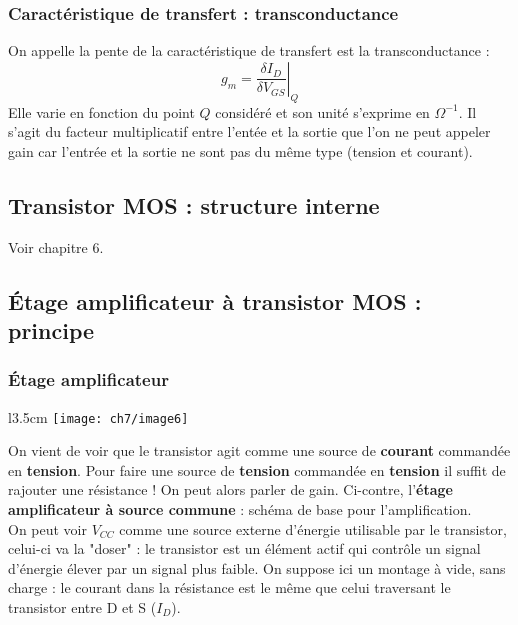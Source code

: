 	\subsubsection{Caractéristique de transfert : transconductance}	
	On appelle la pente de la caractéristique de transfert est la transconductance :
	\begin{equation}
	g_m = \left.\dfrac{\delta I_D}{\delta V_{GS}}\right|_Q
	\end{equation}
	Elle varie en fonction du point $Q$ considéré et son unité s'exprime en 
	$\Omega^{-1}$. Il s'agit du facteur multiplicatif entre l'entée et la sortie que 
	l'on ne peut appeler gain car l'entrée et la sortie ne sont pas du même type (tension 
	et courant).
	
	
	
	\subsection{Transistor MOS : structure interne}	
	Voir chapitre 6.
	
	\subsection{Étage amplificateur à transistor MOS : principe}
		\subsubsection{Étage amplificateur}
			\begin{wrapfigure}[11]{l}{3.5cm}
	\vspace{-0.5cm}
	\texttt{[image: ch7/image6]}
	\end{wrapfigure}
		On vient de voir que le transistor agit comme une source de \textbf{courant} 
		commandée en \textbf{tension}. Pour faire une source de \textbf{tension} 
		commandée en \textbf{tension} il suffit de rajouter une résistance ! On peut 
		alors parler de gain. Ci-contre, l'\textbf{étage amplificateur à source 
		commune} : schéma de base pour l'amplification. \\
		
		On peut voir $V_{CC}$ comme une source externe d'énergie utilisable par le 
		transistor, celui-ci va la "doser" : le transistor est un élément actif qui 
		contrôle un signal d'énergie élever par un signal plus faible. On suppose 
		ici un montage à vide, sans charge : le courant dans la résistance est le 
		même que celui traversant le transistor entre D et S ($I_D$).
	
